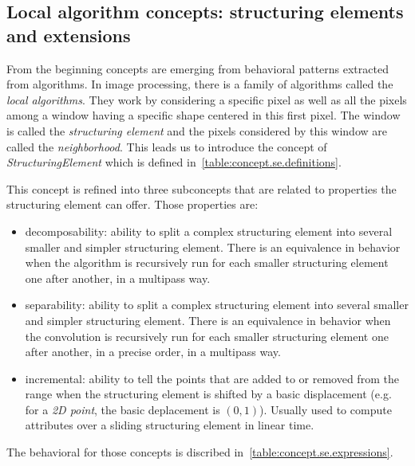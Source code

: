 \subsection{Local algorithm concepts: structuring elements and extensions}
\label{subsec:local.se.ext}

From the beginning concepts are emerging from behavioral patterns extracted from algorithms. In image processing, there
is a family of algorithms called the \emph{local algorithms}. They work by considering a specific pixel as well as all
the pixels among a window having a specific shape centered in this first pixel. The window is called the
\emph{structuring element} and the pixels considered by this window are called the \emph{neighborhood}. This leads us to
introduce the concept of \emph{StructuringElement} which is defined in~\cref{table:concept.se.definitions}.

This concept is refined into three subconcepts that are related to properties the structuring element can offer. Those
properties are:
\begin{itemize}
  \item decomposability: ability to split a complex structuring element into several smaller and simpler structuring
        element. There is an equivalence in behavior when the algorithm is recursively run for each smaller structuring
        element one after another, in a multipass way.
  \item separability: ability to split a complex structuring element into several smaller and simpler structuring
        element. There is an equivalence in behavior when the convolution is recursively run for each smaller structuring
        element one after another, in a precise order, in a multipass way.
  \item incremental: ability to tell the points that are added to or removed from the range when the structuring element
        is shifted by a basic displacement (e.g. for a \emph{2D point}, the basic deplacement is $(0,1)$). Usually used to
        compute attributes over a sliding structuring element in linear time.
\end{itemize}
The behavioral for those concepts is discribed in~\cref{table:concept.se.expressions}.

